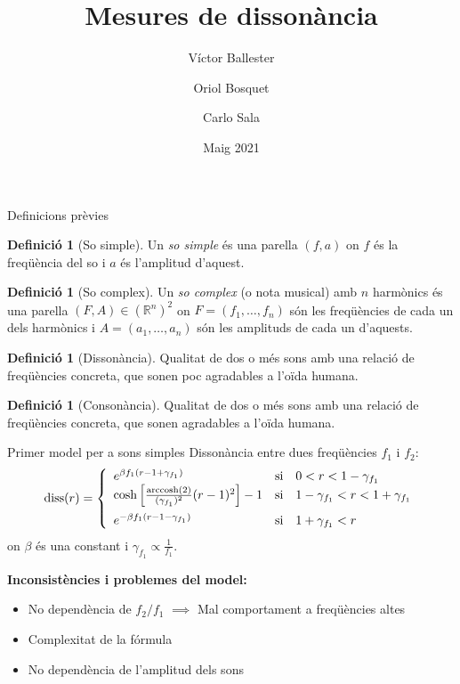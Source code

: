\documentclass[10pt,hyperref={colorlinks,linkcolor=black,citecolor=blue!80,urlcolor=blue!60},handout]{beamer} %
\institute[UAB]{Taller de modelització\\
\vspace{5pt}Grau en Matemàtiques\\
\vspace{5pt}Universitat Autònoma de Barcelona}
\title[Mesures de dissonància]{Mesures de dissonància}
\author[Víctor, Oriol, Carlo]{Víctor Ballester\and Oriol Bosquet\and Carlo Sala}
\date{Maig 2021}
\theoremstyle{definition}
\newtheorem{defin}[theorem]{Definició}
\DeclareMathOperator{\diss}{diss}
\DeclareMathOperator{\arccosh}{arccosh}
\begin{document}
\frame{\titlepage}
\begin{frame}{Definicions prèvies}
    \begin{defin}[So simple]
        Un \textit{so simple} és una parella $(f,a)$ on $f$ és la freqüència del so i $a$ és l'amplitud d'aquest.
    \end{defin}
    \begin{defin}[So complex]
        Un \textit{so complex} (o nota musical) amb $n$ harmònics és una parella $(F,A)\in(\mathbb{R}^n)^2$ on $F = (f_1,\ldots,f_n)$ són les freqüències de cada un dels harmònics i $A = (a_1,\ldots,a_n)$ són les amplituds de cada un d'aquests.
    \end{defin} \pause
    \begin{defin}[Dissonància]
        Qualitat de dos o més sons amb una relació de freqüències concreta, que sonen poc agradables a l'oïda humana.
    \end{defin}
    \begin{defin}[Consonància]
        Qualitat de dos o més sons amb una relació de freqüències concreta, que sonen agradables a l'oïda humana.
    \end{defin}
\end{frame}
\begin{frame}{Primer model per a sons simples}
    Dissonància entre dues freqüències $f_1$ i $f_2$:
    $$\diss(r)=
        \left\{\begin{array}{lll}
            e^{\beta f_1(r-1+\gamma_{f_1})} & \text{si} & 0<r<1-\gamma_{f_1}\\
            \cosh\left[\frac{\arccosh(2)}{(\gamma_{f_1})^2}(r-1)^2\right]-1 & \text{si} & 1-\gamma_{f_1}<r<1+\gamma_{f_1}\vspace{5pt}\\
            e^{-\beta f_1(r-1-\gamma_{f_1})} & \text{si} & 1+\gamma_{f_1}<r
        \end{array}\right.$$ on $\beta$ és una constant i $\gamma_{f_1}\propto\frac{1}{f_1}$.\par\vspace{1cm}\pause
    \textbf{Inconsistències i problemes del model:}
    \begin{itemize}
        \item No dependència de $f_2/f_1$ $\implies$ Mal comportament a freqüències altes\pause
        \item Complexitat de la fórmula\pause
        \item No dependència de l'amplitud dels sons
    \end{itemize}
\end{frame}
\end{document}
